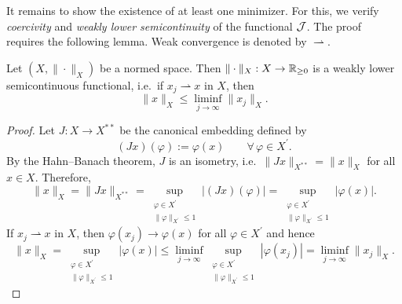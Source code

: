 It remains to show the existence of at least one minimizer. For this, we verify {\em coercivity} and {\em weakly lower semicontinuity} of the functional ${\mathcal J}$. The proof requires the following lemma. Weak convergence is denoted by $\rightharpoonup$.

\begin{lemma}\label{lem:normwlsc}
	Let $(X,\|\cdot\|_X)$ be a normed space. Then $\|\cdot\|_X:X\to {\mathbb R}_{\ge 0}$ is a weakly lower semicontinuous functional, i.e.\ if $x_j\rightharpoonup x$ in $X$, then
	\begin{equation*}
		\|x\|_X \le \liminf_{j\to\infty}\|x_j\|_X.
	\end{equation*}
\end{lemma}
\begin{proof}
	Let $J:X\to X^{**}$ be the canonical embedding defined by
	\begin{equation*}
		(Jx)(\varphi):=\varphi(x)\qquad \forall\, \varphi\in X^\prime.
	\end{equation*}
	By the Hahn--Banach theorem, $J$ is an isometry, i.e.\ $\|Jx\|_{X^{**}}=\|x\|_X$ for all $x\in X$.
	Therefore,
	\begin{equation*}
		\|x\|_X
		=\|Jx\|_{X^{**}}
		=\sup_{\substack{\varphi\in X^\prime\\ \|\varphi\|_{X^\prime}\le 1}} |(Jx)(\varphi)|
		=\sup_{\substack{\varphi\in X^\prime\\ \|\varphi\|_{X^\prime}\le 1}} |\varphi(x)|.
	\end{equation*}
	If $x_j\rightharpoonup x$ in $X$, then $\varphi(x_j)\to\varphi(x)$ for all $\varphi\in X^\prime$ and hence
	\begin{equation*}
		\|x\|_X
		= \sup_{\substack{\varphi\in X^\prime\\ \|\varphi\|_{X^\prime}\le 1}} |\varphi(x)|
		\le \liminf_{j\to\infty}\sup_{\substack{\varphi\in X^\prime\\ \|\varphi\|_{X^\prime}\le 1}}|\varphi(x_j)|
		= \liminf_{j\to\infty}\|x_j\|_X.
	\end{equation*}
\end{proof}

